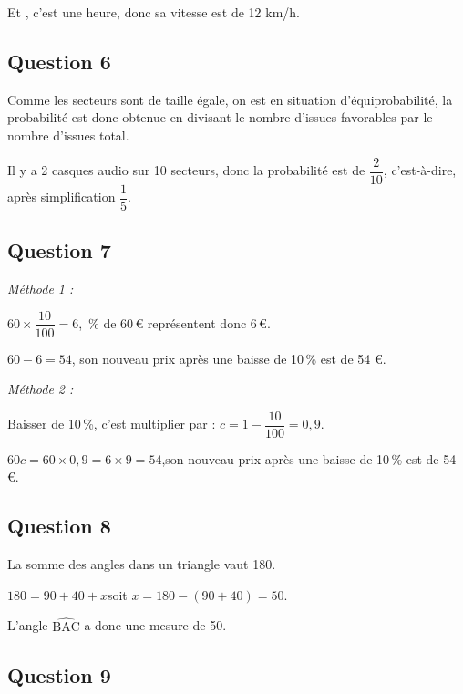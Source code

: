 		Et , c'est une heure, donc sa vitesse est de 12 km/h.

	\subsection*{Question 6}
		Comme les secteurs sont de taille égale, on est en situation d'équiprobabilité, la probabilité est donc obtenue en divisant le nombre d'issues favorables par le nombre d'issues total.

		Il y a 2 casques audio sur 10 secteurs, donc la probabilité est de $\dfrac{2}{10}$, c'est-à-dire, après simplification $\dfrac{1}{5}$.

	\subsection*{Question 7}

		\emph{Méthode 1 :}

		$60\times \dfrac{10}{100}=6$, \,\% de 60\,\euro{} représentent donc 6\,\euro{}.

		$60-6=54$, \quad son nouveau prix après une baisse de 10\,\% est de 54 \euro{}.

		\emph{Méthode 2 :}

		Baisser de 10\,\%, c'est multiplier par : \quad $c = 1 - \dfrac{10}{100} = 0,9$.

		$60c = 60 \times 0,9 = 6 \times 9 = 54$,\quad son nouveau prix après une baisse de 10\,\% est de 54 \euro{}.

	\subsection*{Question 8}
		La somme des angles dans un triangle vaut 180\textdegree.

		$180 = 90+ 40 + x$\quad soit \quad $x =180 -(90+40)=50$.

		L'angle $\widehat{\mathrm{BAC}}$ a donc une mesure de 50\textdegree.

	\subsection*{Question 9}

